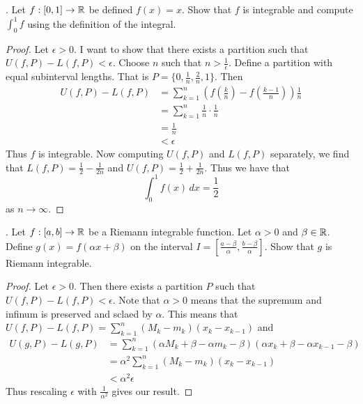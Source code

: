 \documentclass[a4paper]{article}
\begin{document}
\begin{qtn}{}{}
\thetcbcounter.\;\; Let $f:[0,1]\to\mathbb{R}$ be defined $f(x)=x$. Show that $f$ is integrable and compute $\int_0^1f$ using the definition of the integral. \\\hspace*{\fill}\cite{R0003}\tcbline
\begin{proof}
Let $\epsilon>0$. I want to show that there exists a partition such that $U(f,P)-L(f,P)<\epsilon$. Choose $n$ such that $n>\frac{1}{\epsilon}$. Define a partition with equal subinterval lengths. That is $P=\{0,\frac{1}{n},\frac{2}{n},1\}$. Then 
\begin{align*}
U(f,P)-L(f,P)&=\sum_{k=1}^n\left(f\left(\frac{k}{n}\right)-f(\frac{k-1}{n})\right)\frac{1}{n}\\
&=\sum_{k=1}^n\frac{1}{n}\cdot\frac{1}{n}\\
&=\frac{1}{n}\\
&<\epsilon
\end{align*}
Thus $f$ is integrable. Now computing $U(f,P)$ and $L(f,P)$ separately, we find that $L(f,P)=\frac{1}{2}-\frac{1}{2n}$ and $U(f,P)=\frac{1}{2}+\frac{1}{2n}$. Thus we have that $$\int_0^1f(x)\,dx=\frac{1}{2}$$ as $n\to\infty$. 
\end{proof}
\end{qtn}

\begin{qtn}{}{}
\thetcbcounter.\;\; Let $f:[a,b]\to\mathbb{R}$ be a Riemann integrable function. Let $\alpha>0$ and $\beta\in\mathbb{R}$. Define $g(x)=f(\alpha x+\beta)$ on the interval $I=\left[\frac{a-\beta}{\alpha},\frac{b-\beta}{\alpha}\right]$. Show that $g$ is Riemann integrable. \\\hspace*{\fill}\cite{R0003}\tcbline
\begin{proof}
Let $\epsilon>0$. Then there exists a partition $P$ such that $U(f,P)-L(f,P)<\epsilon$. Note that $\alpha>0$ means that the supremum and infinum is preserved and sclaed by $\alpha$. This means that $U(f,P)-L(f,P)=\sum_{k=1}^n(M_k-m_k)(x_k-x_{k-1})$ and 
\begin{align*}
U(g,P)-L(g,P)&=\sum_{k=1}^n(\alpha M_k+\beta-\alpha m_k-\beta)(\alpha x_k+\beta-\alpha x_{k-1}-\beta)\\
&=\alpha^2\sum_{k=1}^n(M_k-m_k)(x_k-x_{k-1})\\
&<\alpha^2\epsilon
\end{align*}
Thus rescaling $\epsilon$ with $\frac{1}{\alpha^2}$ gives our result. 
\end{proof}
\end{qtn}
\end{document}
